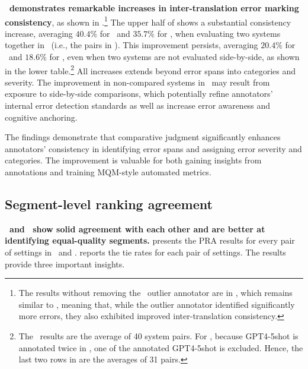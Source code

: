 \textbf{\sxsmqm~demonstrates remarkable increases in inter-translation error marking consistency}, as shown in .\footnote{The results without removing the \ZhEn~outlier annotator are in , which remains similar to , meaning that, while the outlier annotator identified significantly more errors, they also exhibited improved inter-translation consistency.}
The upper half of  shows a substantial consistency increase, averaging $40.4\%$ for \ZhEn~and $35.7\%$ for \EnDe, when evaluating two systems together in \sxsmqm~(i.e., the pairs in ). This improvement persists, averaging $20.4\%$ for \ZhEn~and $18.6\%$ for \EnDe, even when two systems are not evaluated side-by-side, as shown in the lower table.\footnote{The \ZhEn~results are the average of 40 system pairs. For \EnDe, because GPT4-5shot is annotated twice in \sxsmqm, one of the annotated GPT4-5shot is excluded. Hence, the last two rows in  are the averages of 31 pairs.} All increases extends beyond error spans into categories and severity.
The improvement in non-compared systems in \sxsmqm~may result from exposure to side-by-side comparisons, which potentially refine annotators' internal error detection standards as well as increase error awareness and cognitive anchoring.

The findings demonstrate that comparative judgment significantly enhances annotators' consistency in identifying error spans and assigning error severity and categories. The improvement is valuable for both gaining insights from annotations and training MQM-style automated metrics.

\subsection{Segment-level ranking agreement}\label{sec:seg_pra}

\textbf{\sxsmqm~and \sxsqr~show solid agreement with each other and are better at identifying equal-quality segments.}  presents the PRA results for every pair of settings in \ZhEn~and \EnDe.  reports the tie rates for each pair of settings. The results provide three important insights. 

